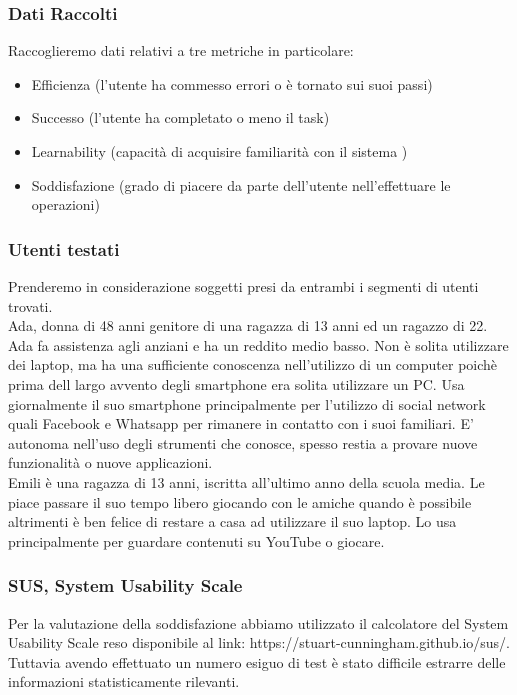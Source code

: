 \documentclass[../Report.tex]{subfiles}
\begin{document}
    \subsubsection{Dati Raccolti}
    Raccoglieremo dati relativi a tre metriche in particolare:
    \begin{itemize}
        \item Efficienza (l’utente ha commesso errori o è tornato sui suoi passi)
        \item Successo (l’utente ha completato o meno il task)
        \item Learnability (capacità di acquisire familiarità con il sistema )
        \item Soddisfazione (grado di piacere da parte dell’utente nell’effettuare le operazioni)
    \end{itemize}
    \subsubsection{Utenti testati}
    Prenderemo in considerazione soggetti presi da entrambi i segmenti di utenti trovati.\\
    Ada, donna di 48 anni genitore di una ragazza di 13 anni ed un ragazzo di 22. Ada fa assistenza agli anziani e ha un reddito medio basso. Non è solita utilizzare dei laptop, ma ha una sufficiente conoscenza nell’utilizzo di un computer poichè prima dell largo avvento degli smartphone era solita utilizzare un PC. Usa giornalmente il suo smartphone principalmente per l’utilizzo di social network quali Facebook e Whatsapp per rimanere in contatto con i suoi familiari. E’ autonoma nell’uso degli strumenti che conosce, spesso restia a provare nuove funzionalità o nuove applicazioni.\\
    Emili è una ragazza di 13 anni, iscritta all’ultimo anno della scuola media. Le piace passare il suo tempo libero giocando con le amiche quando è possibile altrimenti è ben felice di restare a casa ad utilizzare il suo laptop. Lo usa principalmente per guardare contenuti su YouTube o giocare. 

    \subsubsection{SUS, System Usability Scale}
    Per la valutazione della soddisfazione abbiamo utilizzato il calcolatore del System Usability Scale reso disponibile al link: https://stuart-cunningham.github.io/sus/. Tuttavia avendo effettuato un numero esiguo di test è stato difficile estrarre delle informazioni statisticamente rilevanti.
\end{document}

